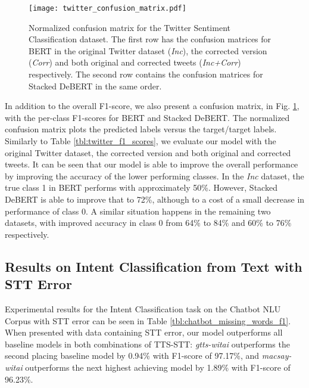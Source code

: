 \documentclass[review]{elsarticle}
\begin{document}
\begin{figure}[ht!]
   \centering
       \texttt{[image: twitter\_confusion\_matrix.pdf]}
   \caption{Normalized confusion matrix for the Twitter Sentiment Classification dataset. The first row has the confusion matrices for BERT in the original Twitter dataset (\textit{Inc}), the corrected version (\textit{Corr}) and both original and corrected tweets (\textit{Inc+Corr}) respectively. The second row contains the confusion matrices for Stacked DeBERT in the same order.}
   \label{fig:twitter_confusion_matrix_plot}
\end{figure}

In addition to the overall F1-score, we also present a confusion matrix, in Fig. \ref{fig:twitter_confusion_matrix_plot}, with the per-class F1-scores for BERT and Stacked DeBERT. The normalized confusion matrix plots the predicted labels versus the target/target labels. Similarly to Table \ref{tbl:twitter_f1_scores}, we evaluate our model with the original Twitter dataset, the corrected version and both original and corrected tweets. It can be seen that our model is able to improve the overall performance by improving the accuracy of the lower performing classes. In the \textit{Inc} dataset, the true class 1 in BERT performs with approximately 50\%. However, Stacked DeBERT is able to improve that to 72\%, although to a cost of a small decrease in performance of class 0. A similar situation happens in the remaining two datasets, with improved accuracy in class 0 from 64\% to 84\% and 60\% to 76\% respectively.


\subsection{Results on Intent Classification from Text with STT Error} \label{sec:results_chatbot}

Experimental results for the Intent Classification task on the Chatbot NLU Corpus with STT error can be seen in Table \ref{tbl:chatbot_missing_words_f1}. When presented with data containing STT error, our model outperforms all baseline models in both combinations of TTS-STT: \textit{gtts-witai} outperforms the second placing baseline model by 0.94\% with F1-score of 97.17\%, and \textit{macsay-witai} outperforms the next highest achieving model by 1.89\% with F1-score of 96.23\%.
\end{document}
